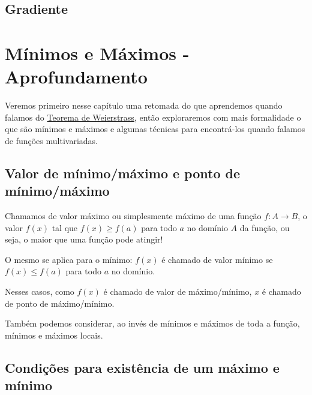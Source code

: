 \documentclass[
  letterpaper,
  DIV=11,
  numbers=noendperiod]{scrreprt}
\begin{document}
\section{Gradiente}\label{gradiente}

\chapter{}\label{section-1}

\chapter{}\label{section-2}

\chapter{Mínimos e Máximos -
Aprofundamento}\label{muxednimos-e-muxe1ximos---aprofundamento}

Veremos primeiro nesse capítulo uma retomada do que aprendemos quando
falamos do \href{weierstrass.qmd}{Teorema de Weierstrass}, então
exploraremos com mais formalidade o que são mínimos e máximos e algumas
técnicas para encontrá-los quando falamos de funções multivariadas.

\section{Valor de mínimo/máximo e ponto de
mínimo/máximo}\label{valor-de-muxednimomuxe1ximo-e-ponto-de-muxednimomuxe1ximo}

Chamamos de valor máximo ou simplesmente máximo de uma função
\(f: A \rightarrow B\), o valor \(f(x)\) tal que \(f(x) \geq f(a)\) para
todo \(a\) no domínio \(A\) da função, ou seja, o maior que uma função
pode atingir!

O mesmo se aplica para o mínimo: \(f(x)\) é chamado de valor mínimo se
\(f(x) \leq f(a)\) para todo \(a\) no domínio.

Nesses casos, como \(f(x)\) é chamado de valor de máximo/mínimo, \(x\) é
chamado de ponto de máximo/mínimo.

Também podemos considerar, ao invés de mínimos e máximos de toda a
função, mínimos e máximos locais.

\section{Condições para existência de um máximo e
mínimo}\label{condiuxe7uxf5es-para-existuxeancia-de-um-muxe1ximo-e-muxednimo}
\end{document}
